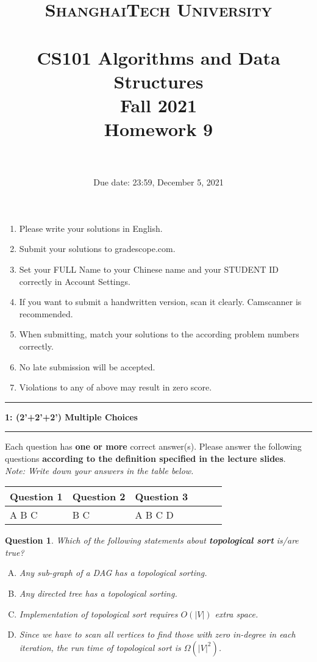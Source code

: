 \documentclass[10.5pt]{article}
\title{
	\normalfont \normalsize
	\textsc{ShanghaiTech University} \\ [25pt]
	\horrule{0.5pt} \\[0.4cm] %
	\huge CS101 Algorithms and Data Structures\\ %
	\LARGE Fall 2021\\
	\LARGE Homework 9\\
	\horrule{2pt} \\[0.5cm] %
}
\author{}
\date{Due date: 23:59, December 5, 2021}
\newcommand\question[2]{\vspace{.25in}\hrule\textbf{#1: #2}\vspace{.5em}\hrule\vspace{.10in}}
\newtheorem{Q}{Question}
\begin{document}
\maketitle
\thispagestyle{firstpage}
\vspace{3ex}

\begin{enumerate}
	\item Please write your solutions in English.

	\item Submit your solutions to gradescope.com.

	\item Set your FULL Name to your Chinese name and your STUDENT ID correctly in Account Settings.

	\item If you want to submit a handwritten version, scan it clearly. Camscanner is recommended.

	\item When submitting, match your solutions to the according problem numbers correctly.

	\item No late submission will be accepted.

	\item Violations to any of above may result in zero score.
\end{enumerate}

\newpage



\question{1}{(2'+2'+2') Multiple Choices}
Each question has \textbf{one or more} correct answer(s). Please answer the following questions \textbf{according to  the definition specified in the lecture slides}.\\

\textit{Note: Write down your answers in the table below. }
\begin{table}[htbp]
	\begin{tabular}{|p{2cm}|p{2cm}|p{2cm}|p{2cm}|p{2cm}|p{2cm}|}
		\hline
		Question 1 & Question 2 & Question 3 \\
		\hline
		A B C      & B C        & A B C D    \\
		\hline
	\end{tabular}
\end{table}

\begin{Q}
	Which of the following statements about \textbf{topological sort} is/are true?
	\begin{enumerate}[(A)]
		\item Any sub-graph of a DAG has a topological sorting.
		\item Any directed tree has a topological sorting.
		\item Implementation of topological sort requires $O(|V|)$ extra space.
		\item Since we have to scan all vertices to find those with zero in-degree in each iteration, the run time of topological sort is $\Omega(|V|^2)$.
	\end{enumerate}
\end{Q}
\vspace{0.5cm}
\end{document}

